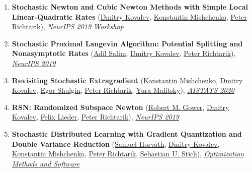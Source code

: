 \begin{enumerate}
\item \textbf{Stochastic Newton and Cubic Newton Methods with Simple Local Linear-Quadratic Rates} (\href{https://www.dmitry-kovalev.com}{\color{linkcolour}Dmitry Kovalev}, \href{https://konstmish.github.io}{\color{linkcolour}Konstantin Mishchenko}, \href{https://richtarik.org}{\color{linkcolour}Peter Richtarik}), \href{https://sites.google.com/site/optneurips19/}{\em \color{black}NeurIPS 2019 Workshop}
\item \textbf{Stochastic Proximal Langevin Algorithm: Potential Splitting and Nonasymptotic Rates} (\href{https://adil-salim.github.io}{\color{linkcolour}Adil Salim}, \href{https://www.dmitry-kovalev.com}{\color{linkcolour}Dmitry Kovalev}, \href{https://richtarik.org}{\color{linkcolour}Peter Richtarik}), \href{https://papers.nips.cc/paper/8891-stochastic-proximal-langevin-algorithm-potential-splitting-and-nonasymptotic-rates}{\em \color{black}NeurIPS 2019}
\item \textbf{Revisiting Stochastic Extragradient} (\href{https://konstmish.github.io}{\color{linkcolour}Konstantin Mishchenko}, \href{https://www.dmitry-kovalev.com}{\color{linkcolour}Dmitry Kovalev}, \href{https://shulgin-egor.github.io}{\color{linkcolour}Egor Shulgin}, \href{https://richtarik.org}{\color{linkcolour}Peter Richtarik}, \href{https://scholar.google.com/citations?user=GI_-KjoAAAAJ}{\color{linkcolour}Yura Malitsky}), \href{http://proceedings.mlr.press/v108/mishchenko20a}{\em \color{black}AISTATS 2020}
\item \textbf{RSN: Randomized Subspace Newton} (\href{https://gowerrobert.github.io}{\color{linkcolour}Robert M. Gower}, \href{https://www.dmitry-kovalev.com}{\color{linkcolour}Dmitry Kovalev}, \href{http://www.opt.uni-duesseldorf.de/~lieder/de/inhalt.php}{\color{linkcolour}Felix Lieder}, \href{https://richtarik.org}{\color{linkcolour}Peter Richtarik}), \href{https://papers.nips.cc/paper/8351-rsn-randomized-subspace-newton}{\em \color{black}NeurIPS 2019}
\item \textbf{Stochastic Distributed Learning with Gradient Quantization and Double Variance Reduction} (\href{https://samuelhorvath.github.io}{\color{linkcolour}Samuel Horvath}, \href{https://www.dmitry-kovalev.com}{\color{linkcolour}Dmitry Kovalev}, \href{https://konstmish.github.io}{\color{linkcolour}Konstantin Mishchenko}, \href{https://richtarik.org}{\color{linkcolour}Peter Richtarik}, \href{https://sstich.ch}{\color{linkcolour}Sebastian U. Stich}), \href{https://www.tandfonline.com/doi/abs/10.1080/10556788.2022.2117355}{\em \color{black}Optimization Methods and Software}

\end{enumerate}
